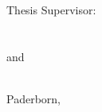 \begin{titlepage}
\begin{center}
  Thesis Supervisor:\\
  
\ifthenelse{\equal{\ausarbeitungsTyp}{\ausarbeitungsTypSeminar}\OR{\equal{\ausarbeitungsTyp}{\ausarbeitungsTypProSeminar}}}
{
	{\large \meinErstgutachter}\\[30pt]
}
{
 	{\large \meinErstgutachter}\\
  and\\
  {\large \meinZweitgutachter}\\[30pt]
}
  
  {Paderborn, \meinErstellungsdatum}
\end{center}
\end{titlepage}
\clearpage



